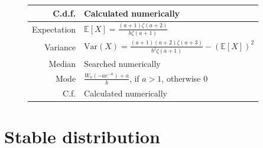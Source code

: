 \documentclass[a4paper,11pt]{article}
\theoremstyle{plain}
\theoremstyle{definition}
\newcommand{\ME}{\mathbb{E}}
\newcommand{\Var}{\mathrm{Var}}
\begin{document}
\begin{figure}[!htb]
\begin{minipage}{0.4\textwidth}
\begin{tabular}{| r | l |}
			\hline
			C.d.f. & Calculated numerically \\
			\hline
			Expectation & $\ME[X] = \frac{(a+1)\zeta(a+2)}{b \zeta(a+1)}$ \\
			\hline
			Variance & $\Var(X) = \frac{(a+1)(a+2)\zeta(a+3)}{b^2 \zeta(a+1)}  - (\ME[X])^2$ \\
			\hline
			Median & Searched numerically \\
			\hline
			Mode & $\frac{W_0(-a e^{-a}) + a}{b}$, if $a > 1$, otherwise $0$ \\
			\hline
			C.f. & Calculated numerically \\
			\hline
		\end{tabular}
	\end{minipage}
    \end{figure}
	
	\section{Stable distribution}
\end{document}
